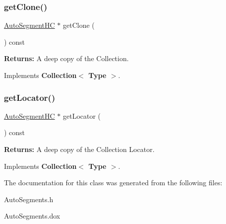 \subsubsection{\texorpdfstring{get\+Clone()}{getClone()}}
{\footnotesize\ttfamily \mbox{\hyperlink{namespaceKatabatic_acb3628dc7705fefe38a665cfe43efa6e}{Auto\+Segment\+HC}} $\ast$ get\+Clone (\begin{DoxyParamCaption}{ }\end{DoxyParamCaption}) const\hspace{0.3cm}{\ttfamily [virtual]}}

{\bfseries Returns\+:} A deep copy of the Collection. 

Implements \textbf{ Collection$<$ Type $>$}.

\mbox{\label{classKatabatic_1_1AutoSegments__OnContact_a07665c070fcc269aec02ce842f384483}} 
\subsubsection{\texorpdfstring{get\+Locator()}{getLocator()}}
{\footnotesize\ttfamily \mbox{\hyperlink{namespaceKatabatic_acb3628dc7705fefe38a665cfe43efa6e}{Auto\+Segment\+HC}} $\ast$ get\+Locator (\begin{DoxyParamCaption}{ }\end{DoxyParamCaption}) const\hspace{0.3cm}{\ttfamily [virtual]}}

{\bfseries Returns\+:} A deep copy of the Collection Locator. 

Implements \textbf{ Collection$<$ Type $>$}.



The documentation for this class was generated from the following files\+:\begin{DoxyCompactItemize}
\item 
Auto\+Segments.\+h\item 
Auto\+Segments.\+dox\end{DoxyCompactItemize}
